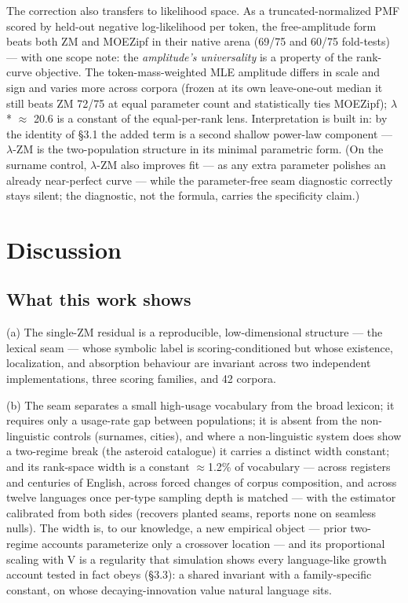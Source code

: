 \documentclass[11pt]{article}
\begin{document}
The correction also transfers to likelihood space. As a truncated-normalized PMF scored by held-out negative log-likelihood per token, the free-amplitude form beats both ZM and MOEZipf in their native arena (69/75 and 60/75 fold-tests) --- with one scope note: the \emph{amplitude's universality} is a property of the rank-curve objective. The token-mass-weighted MLE amplitude differs in scale and sign and varies more across corpora (frozen at its own leave-one-out median it still beats ZM 72/75 at equal parameter count and statistically ties MOEZipf); $\lambda$* $\approx$ 20.6 is a constant of the equal-per-rank lens. Interpretation is built in: by the identity of \S3.1 the added term is a second shallow power-law component --- $\lambda$-ZM is the two-population structure in its minimal parametric form. (On the surname control, $\lambda$-ZM also improves fit --- as any extra parameter polishes an already near-perfect curve --- while the parameter-free seam diagnostic correctly stays silent; the diagnostic, not the formula, carries the specificity claim.)

\section{Discussion}
\subsection{What this work shows}
(a) The single-ZM residual is a reproducible, low-dimensional structure --- the lexical seam --- whose symbolic label is scoring-conditioned but whose existence, localization, and absorption behaviour are invariant across two independent implementations, three scoring families, and 42 corpora.

(b) The seam separates a small high-usage vocabulary from the broad lexicon; it requires only a usage-rate gap between populations; it is absent from the non-linguistic controls (surnames, cities), and where a non-linguistic system does show a two-regime break (the asteroid catalogue) it carries a distinct width constant; and its rank-space width is a constant $\approx$1.2\% of vocabulary --- across registers and centuries of English, across forced changes of corpus composition, and across twelve languages once per-type sampling depth is matched --- with the estimator calibrated from both sides (recovers planted seams, reports none on seamless nulls). The width is, to our knowledge, a new empirical object --- prior two-regime accounts parameterize only a crossover location --- and its proportional scaling with V is a regularity that simulation shows every language-like growth account tested in fact obeys (\S3.3): a shared invariant with a family-specific constant, on whose decaying-innovation value natural language sits.
\end{document}
